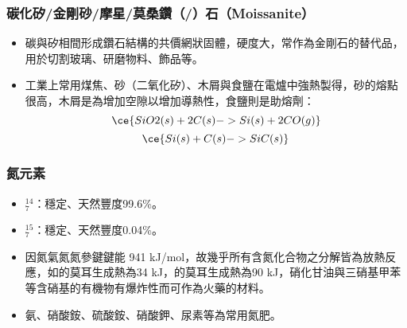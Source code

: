 \documentclass[a4paper,12pt]{report}
\begin{document}
\subsubsection{碳化矽/金剛砂/摩星/莫桑鑽（/）石（Moissanite）}
\begin{itemize}
\item 碳與矽相間形成鑽石結構的共價網狀固體，硬度大，常作為金剛石的替代品，用於切割玻璃、研磨物料、飾品等。
\item 工業上常用煤焦、砂（二氧化矽）、木屑與食鹽在電爐中強熱製得，砂的熔點很高，木屑是為增加空隙以增加導熱性，食鹽則是助熔劑：
\[\ce{SiO2(s) + 2C(s) -> Si(s) + 2CO(g)}\]
\[\ce{Si(s) + C(s) -> SiC(s)}\]
\end{itemize}
\subsubsection{氮元素}
\begin{itemize}
\item $^{14}_7$\rmN：穩定、天然豐度99.6\%。
\item $^{15}_7$\rmN：穩定、天然豐度0.04\%。
\item 因氮氣氮氮參鍵鍵能 941 kJ/mol，故幾乎所有含氮化合物之分解皆為放熱反應，如的莫耳生成熱為34 kJ，的莫耳生成熱為90 kJ，硝化甘油與三硝基甲苯等含硝基的有機物有爆炸性而可作為火藥的材料。
\item 氨、硝酸銨、硫酸銨、硝酸鉀、尿素等為常用氮肥。
\end{itemize}
\end{document}

